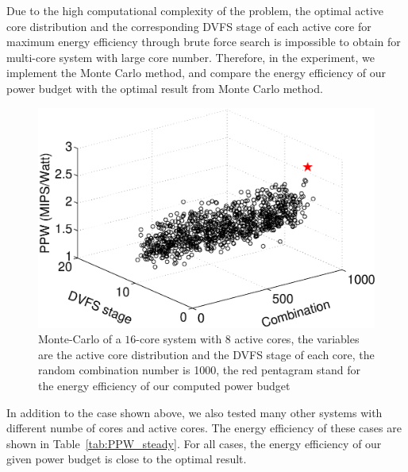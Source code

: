 Due to the high computational complexity of the problem, the optimal active core distribution and the corresponding DVFS stage of each active core for maximum energy efficiency through brute force search is impossible to obtain for multi-core system with large core number. Therefore, in the experiment, we implement the Monte Carlo method, and compare the energy efficiency of our power budget with the optimal result from Monte Carlo method. 
\begin{figure}
\centering
\includegraphics[width=1\linewidth]{fig/best_steady.eps}
\caption{Monte-Carlo of a $16$-core system with $8$ active cores, the variables are the active core distribution and the DVFS stage of each core, the random combination number is 1000, the red pentagram stand for the energy efficiency of our computed power budget}
\end{figure}





In addition to the case shown above, we also tested many other systems with different numbe of cores and active cores. The energy efficiency of these cases are shown in Table~\ref{tab:PPW_steady}. For all cases, the energy efficiency of our given power budget is close to the optimal result.





